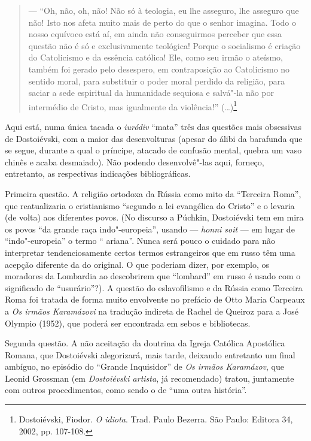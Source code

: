 \begin{quote}
--- ``Oh, não, oh, não! Não só à teologia, eu lhe asseguro, lhe
asseguro que não! Isto nos afeta muito mais de perto do que o senhor
imagina. Todo o nosso equívoco está aí, em ainda não conseguirmos
perceber que essa questão não é só e exclusivamente teológica! Porque o
socialismo é criação do Catolicismo e da essência católica! Ele, como
seu irmão o ateísmo, também foi gerado pelo desespero, em contraposição
ao Catolicismo no sentido moral, para substituir o poder moral perdido
da religião, para saciar a sede espiritual da humanidade sequiosa e
salvá"-la não por intermédio de Cristo, mas igualmente da violência!'' (\ldots{})\footnote{Dostoiévski, Fiodor. \emph{O idiota}. Trad. Paulo
Bezerra. São Paulo: Editora 34, 2002, pp. 107-108.}
\end{quote}

Aqui está, numa única tacada o \emph{iuródiv} ``mata'' três das questões
mais obsessivas de Dostoiévski, com a maior das desenvolturas (apesar
do álibi da barafunda que se segue, durante a qual o príncipe, atacado
de confusão mental, quebra um vaso chinês e acaba desmaiado). Não
podendo desenvolvê"-las aqui, forneço, entretanto, as respectivas indicações
bibliográficas.

Primeira questão. A religião ortodoxa da Rússia como mito da ``Terceira Roma'', que
reatualizaria o cristianismo ``segundo a lei evangélica do Cristo'' e o
levaria (de volta) aos diferentes povos. (No discurso a Púchkin,
Dostoiévski tem em mira os povos ``da grande raça indo"-europeia'',
usando --- \emph{honni soit} --- em lugar de ``indo"-europeia'' o termo ``
ariana''. Nunca será pouco o cuidado para não interpretar
tendenciosamente certos termos estrangeiros que em russo têm uma acepção
diferente da do original. O que poderiam dizer, por exemplo, os
moradores da Lombardia ao descobrirem que ``lombard'' em russo é usado
com o significado de ``usurário''?). A questão do eslavofilismo e da
Rússia como Terceira Roma foi tratada de forma muito envolvente no
prefácio de Otto Maria Carpeaux a \emph{Os irmãos Karamázovi} na
tradução indireta de Rachel de Queiroz para a José Olympio (1952), que
poderá ser encontrada em sebos e bibliotecas.

Segunda questão. A não aceitação da doutrina da Igreja Católica Apostólica Romana, que
Dostoiévski alegorizará, mais tarde, deixando entretanto um final
ambíguo, no episódio do ``Grande Inquisidor'' de \emph{Os irmãos
Karamázov}, que Leonid Grossman (em \emph{Dostoiévski artista}, já recomendado) tratou, juntamente com outros
procedimentos, como sendo o de ``uma outra história''.

